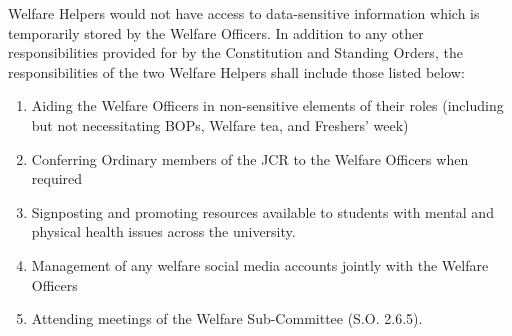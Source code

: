\npara Welfare Helpers would not have access to data-sensitive information which is temporarily stored by the Welfare Officers.
\npara In addition to any other responsibilities provided for by the Constitution and Standing Orders, the responsibilities of the two Welfare Helpers shall include those listed below: 
\begin{enumerate}
    \item Aiding the Welfare Officers in non-sensitive elements of their roles (including but not necessitating BOPs, Welfare tea, and Freshers’ week) 
    \item Conferring Ordinary members of the JCR to the Welfare Officers when required
    \item Signposting and promoting resources available to students with mental and physical health issues across the university.
    \item Management of any welfare social media accounts jointly with the Welfare Officers
    \item Attending meetings of the Welfare Sub-Committee (S.O. 2.6.5).
\end{enumerate}


